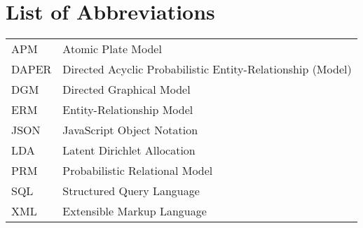 \section*{List of Abbreviations}

\begin{tabular}{ll}
APM & Atomic Plate Model\\
DAPER & Directed Acyclic Probabilistic Entity-Relationship (Model)\\
DGM & Directed Graphical Model\\
ERM & Entity-Relationship Model\\
JSON & JavaScript Object Notation\\
LDA & Latent Dirichlet Allocation\\
PRM & Probabilistic Relational Model\\
SQL & Structured Query Language\\
XML & Extensible Markup Language

\end{tabular}